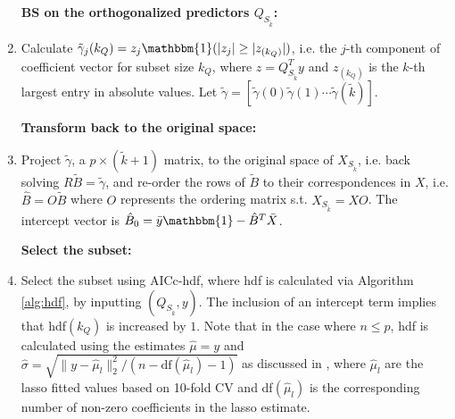 \begin{algorithm}
\begin{enumerate}[label=\arabic*.]
		\textbf{BS on the orthogonalized predictors $Q_{S_{\tilde{k}}}$:}

		\item Calculate $\tilde{\gamma}_j (k_Q)= z_j \mathbbm{1}(|z_j| \ge |z_{(k_Q)}|)$, i.e. the $j$-th component of coefficient vector for subset size $k_Q$, where $z=Q_{S_{\tilde{k}}}^T y$ and $z_{(k_Q)}$ is the $k$-th largest entry in absolute values. Let $\tilde{\gamma} = [\tilde{\gamma} (0) \tilde{\gamma} (1) \cdots \tilde{\gamma} (\tilde{k})]$.
		
		\textbf{Transform back to the original space:}

		\item Project $\tilde{\gamma}$, a $p \times (\tilde{k}+1)$ matrix, to the original space of $X_{S_{\tilde{k}}}$, i.e. back solving $R \tilde{B} = \tilde{\gamma}$, and re-order the rows of $\tilde{B}$ to their correspondences in $X$, i.e. $\hat{B} = O \tilde{B}$ where $O$ represents the ordering matrix s.t. $X_{S_{\tilde{k}}}=XO$. The intercept vector is $\hat{B}_0 = \bar{y} \mathbbm{1} - \hat{B}^T \bar{X}$. 

		\textbf{Select the subset:}

		\item Select the subset using AICc-hdf, where hdf is calculated via Algorithm \ref{alg:hdf}, by inputting $(Q_{S_{\tilde{k}}},y)$. The inclusion of an intercept term implies that hdf$(k_Q)$ is increased by $1$. Note that in the case where $n\le p$, hdf is calculated using the estimates $\hat{\mu}=y$ and $\hat{\sigma} = \sqrt{\lVert y-\hat{\mu}_l \rVert_2^2 / (n-\text{df}(\hat{\mu}_l)-1)}$ as discussed in \citet{reid2016study}, where $\hat{\mu}_l$ are the lasso fitted values based on 10-fold CV and df$(\hat{\mu}_l)$ is the corresponding number of non-zero coefficients in the lasso estimate. 
	\end{enumerate}
\end{algorithm}


